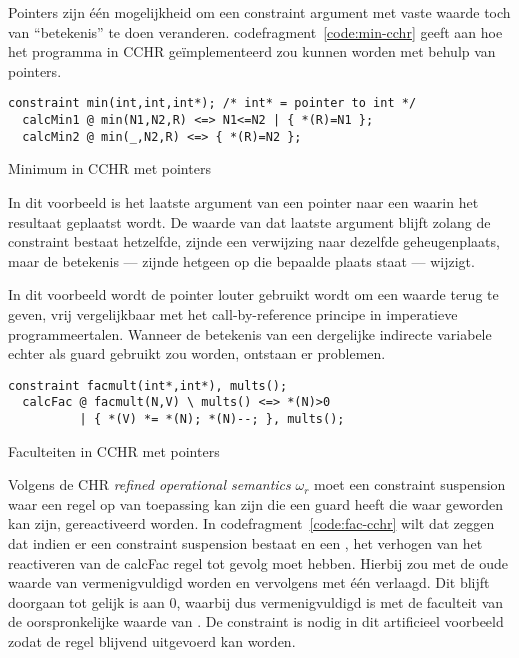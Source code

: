 Pointers zijn \'e\'en mogelijkheid om een constraint argument met vaste waarde toch van ``betekenis'' te doen veranderen. codefragment~\ref{code:min-cchr} geeft aan hoe het  programma in CCHR ge\"implementeerd zou kunnen worden met behulp van pointers.
\begin{exCode}
\begin{Verbatim}[frame=single]
  constraint min(int,int,int*); /* int* = pointer to int */
  calcMin1 @ min(N1,N2,R) <=> N1<=N2 | { *(R)=N1 };
  calcMin2 @ min(_,N2,R) <=> { *(R)=N2 };
\end{Verbatim}
\caption{Minimum in CCHR met pointers}
\label{code:min-cchr}
\end{exCode}

In dit voorbeeld is het laatste argument van  een pointer naar een  waarin het resultaat geplaatst wordt. De waarde van dat laatste argument blijft zolang de constraint bestaat hetzelfde, zijnde een verwijzing naar dezelfde geheugenplaats, maar de betekenis --- zijnde hetgeen op die bepaalde plaats staat --- wijzigt.

In dit voorbeeld wordt de pointer louter gebruikt wordt om een waarde terug te geven, vrij vergelijkbaar met het call-by-reference principe in imperatieve programmeertalen. Wanneer de betekenis van een dergelijke indirecte variabele echter als guard gebruikt zou worden, ontstaan er problemen.
\begin{exCode}
\begin{Verbatim}[frame=single]
  constraint facmult(int*,int*), mults();
  calcFac @ facmult(N,V) \ mults() <=> *(N)>0 
          | { *(V) *= *(N); *(N)--; }, mults();
\end{Verbatim}
\caption{Faculteiten in CCHR met pointers}
\label{code:fac-cchr}
\end{exCode}
Volgens de CHR {\em refined operational semantics} $\omega_r$ moet een constraint suspension waar een regel op van toepassing kan zijn die een guard heeft die waar geworden kan zijn, gereactiveerd worden. In codefragment~\ref{code:fac-cchr} wilt dat zeggen dat indien er een  constraint suspension bestaat en een , het verhogen van  het reactiveren van de calcFac regel tot gevolg moet hebben. Hierbij zou  met de oude waarde van  vermenigvuldigd worden en  vervolgens met \'e\'en verlaagd. Dit blijft doorgaan tot  gelijk is aan $0$, waarbij  dus vermenigvuldigd is met de faculteit van de oorspronkelijke waarde van . De  constraint is nodig in dit artificieel voorbeeld zodat de  regel blijvend uitgevoerd kan worden.

